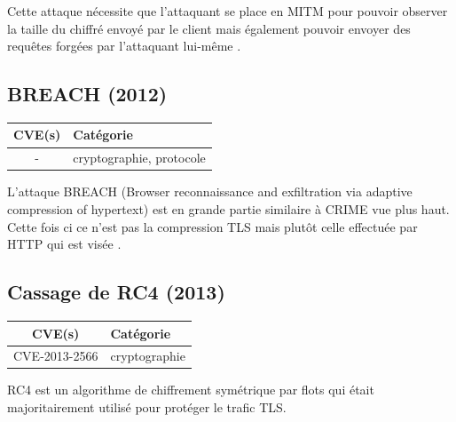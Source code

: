 Cette attaque nécessite que l'attaquant se place en MITM pour pouvoir observer la taille du chiffré envoyé par le client mais également pouvoir envoyer des requêtes forgées par l'attaquant lui-même \cite{crime}.




\subsection{BREACH (2012)}

\begin{tabularx}{0.96\textwidth}{|c|X|}
  \hline
  \textbf{CVE(s)} & \textbf{Catégorie} \\
  \hline
  - & cryptographie, protocole \\
  \hline
\end{tabularx}

\vspace{1em}


L'attaque BREACH (Browser reconnaissance and exfiltration via adaptive compression of hypertext) est en grande partie similaire à CRIME vue plus haut. Cette fois ci ce n'est pas la compression TLS mais plutôt celle effectuée par HTTP qui est visée \cite{breach}.




\subsection{Cassage de RC4 (2013)}

\begin{tabularx}{0.96\textwidth}{|c|X|}
  \hline
  \textbf{CVE(s)} & \textbf{Catégorie} \\
  \hline
  CVE-2013-2566 & cryptographie \\
  \hline
\end{tabularx}

\vspace{1em}


RC4 est un algorithme de chiffrement symétrique par flots qui était majoritairement utilisé pour protéger le trafic TLS.

